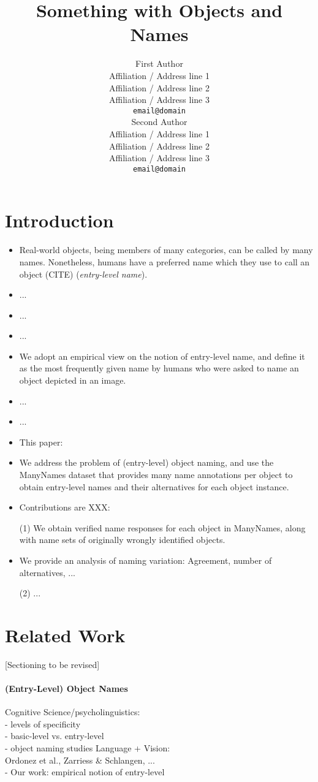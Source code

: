 \documentclass[11pt,a4paper]{article}
\title{Something with Objects and Names}
\author{First Author \\
  Affiliation / Address line 1 \\
  Affiliation / Address line 2 \\
  Affiliation / Address line 3 \\
  \texttt{email@domain} \\\And
  Second Author \\
  Affiliation / Address line 1 \\
  Affiliation / Address line 2 \\
  Affiliation / Address line 3 \\
  \texttt{email@domain} \\}
\date{}
\newcommand{\mn}{ManyNames\xspace}
\begin{document}
\maketitle
\begin{abstract}

\end{abstract}

\section{Introduction}
\label{sec:intro}
%

\begin{itemize}
	\item Real-world objects, being members of many categories, can be called by many names. Nonetheless, humans have a preferred name which they use to call an object (CITE) (\textsl{entry-level name}). 
	\item ...
	\item ...
	\item ...
	\item We adopt an empirical view on the notion of entry-level name, and define it  as the most frequently given name by humans who were asked to name an object depicted in an image. 
	\item ...
	\item ...
	\item This paper:
	\item We address the problem of (entry-level) object naming, and use the \mn dataset that provides many name annotations per object to obtain entry-level names and their alternatives for each object instance. 
	\item Contributions are XXX:
	\item[(1)] We obtain verified name responses for each object in \mn, along with name sets of originally wrongly identified objects. 
	\item We provide an analysis of naming variation: Agreement, number of alternatives, ...
	\item[(2)] ...
\end{itemize}

\section{Related Work}
\label{sec:related}
%

[Sectioning to be revised]

\paragraph{(Entry-Level) Object Names}
Cognitive Science/psycholinguistics:\\
- levels of specificity\\
- basic-level vs. entry-level\\
- object naming studies
Language + Vision:\\
Ordonez et al., Zarriess \& Schlangen, ... \\
- Our work: empirical notion of entry-level
\end{document}
